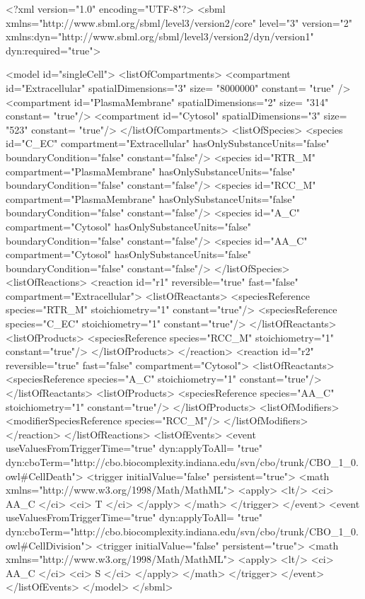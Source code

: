 \begin{example}
<?xml version="1.0" encoding="UTF-8"?>
<sbml xmlns="http://www.sbml.org/sbml/level3/version2/core" level="3" version="2"
	  xmlns:dyn="http://www.sbml.org/sbml/level3/version2/dyn/version1" dyn:required="true">

	<model id="singleCell">
		<listOfCompartments>
			<compartment id="Extracellular" spatialDimensions="3" size= "8000000" constant= "true" />
			<compartment id="PlasmaMembrane" spatialDimensions="2" size= "314" constant= "true"/>
			<compartment id="Cytosol" spatialDimensions="3" size= "523" constant= "true"/>
		</listOfCompartments>
		<listOfSpecies>
			<species id="C_EC"  compartment="Extracellular" hasOnlySubstanceUnits="false" 
							  boundaryCondition="false" constant="false"/>
			<species id="RTR_M" compartment="PlasmaMembrane" hasOnlySubstanceUnits="false" 
								boundaryCondition="false" constant="false"/>
			<species id="RCC_M" compartment="PlasmaMembrane" hasOnlySubstanceUnits="false" 
								boundaryCondition="false" constant="false"/>
			<species id="A_C"   compartment="Cytosol" hasOnlySubstanceUnits="false" 
								boundaryCondition="false" constant="false"/>
			<species id="AA_C"  compartment="Cytosol" hasOnlySubstanceUnits="false" 
								boundaryCondition="false" constant="false"/>
		</listOfSpecies>
		<listOfReactions>
			<reaction id="r1" reversible="true" fast="false" compartment="Extracellular">
				<listOfReactants>
					<speciesReference species="RTR_M" stoichiometry="1" constant="true"/>
					<speciesReference species="C_EC" stoichiometry="1" constant="true"/>
				</listOfReactants>
				<listOfProducts>
					<speciesReference species="RCC_M" stoichiometry="1" constant="true"/>
				</listOfProducts>
			</reaction>
			<reaction id="r2" reversible="true" fast="false" compartment="Cytosol">
				<listOfReactants>
					<speciesReference species="A_C" stoichiometry="1" constant="true"/>
				</listOfReactants>
				<listOfProducts>
					<speciesReference species="AA_C" stoichiometry="1" constant="true"/>
				</listOfProducts>
				<listOfModifiers>
					<modifierSpeciesReference species="RCC_M"/>
				</listOfModifiers>
			</reaction>
		</listOfReactions>
		<listOfEvents>
			<event useValuesFromTriggerTime="true" dyn:applyToAll= "true"
			       dyn:cboTerm="http://cbo.biocomplexity.indiana.edu/svn/cbo/trunk/CBO_1_0.owl#CellDeath">
				<trigger initialValue="false" persistent="true">
					<math xmlns="http://www.w3.org/1998/Math/MathML">
						<apply> <lt/> <ci> AA_C </ci> <ci> T </ci> </apply>
					</math>
				</trigger>
			</event>
			<event useValuesFromTriggerTime="true" dyn:applyToAll= "true"
			       dyn:cboTerm="http://cbo.biocomplexity.indiana.edu/svn/cbo/trunk/CBO_1_0.owl#CellDivision">
				<trigger initialValue="false" persistent="true">
					<math xmlns="http://www.w3.org/1998/Math/MathML">
						<apply> <lt/> <ci> AA_C </ci> <ci> S </ci> </apply>
					</math>
				</trigger>
			</event>	
		</listOfEvents>
	</model>
</sbml>
\end{example}

